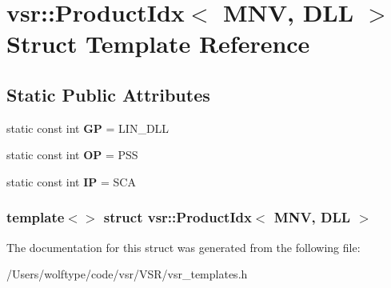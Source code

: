 \hypertarget{structvsr_1_1_product_idx_3_01_m_n_v_00_01_d_l_l_01_4}{\section{vsr\-:\-:Product\-Idx$<$ M\-N\-V, D\-L\-L $>$ Struct Template Reference}
\label{structvsr_1_1_product_idx_3_01_m_n_v_00_01_d_l_l_01_4}
}
\subsection*{Static Public Attributes}
\begin{DoxyCompactItemize}
\item 
\hypertarget{structvsr_1_1_product_idx_3_01_m_n_v_00_01_d_l_l_01_4_a75fe81480340bb51b9bc42444f1a7da9}{static const int {\bfseries G\-P} = L\-I\-N\-\_\-\-D\-L\-L}\label{structvsr_1_1_product_idx_3_01_m_n_v_00_01_d_l_l_01_4_a75fe81480340bb51b9bc42444f1a7da9}

\item 
\hypertarget{structvsr_1_1_product_idx_3_01_m_n_v_00_01_d_l_l_01_4_afdbc38984c74004c8c17864b659a1bbd}{static const int {\bfseries O\-P} = P\-S\-S}\label{structvsr_1_1_product_idx_3_01_m_n_v_00_01_d_l_l_01_4_afdbc38984c74004c8c17864b659a1bbd}

\item 
\hypertarget{structvsr_1_1_product_idx_3_01_m_n_v_00_01_d_l_l_01_4_a3bc47fb72a39bfa5d957a288e8083474}{static const int {\bfseries I\-P} = S\-C\-A}\label{structvsr_1_1_product_idx_3_01_m_n_v_00_01_d_l_l_01_4_a3bc47fb72a39bfa5d957a288e8083474}

\end{DoxyCompactItemize}
\subsubsection*{template$<$$>$ struct vsr\-::\-Product\-Idx$<$ M\-N\-V, D\-L\-L $>$}



The documentation for this struct was generated from the following file\-:\begin{DoxyCompactItemize}
\item 
/\-Users/wolftype/code/vsr/\-V\-S\-R/vsr\-\_\-templates.\-h\end{DoxyCompactItemize}
